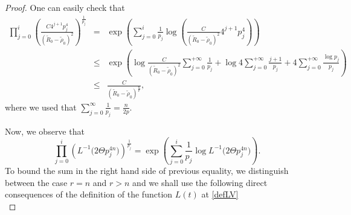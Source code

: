 \documentclass[12pt]{amsart}
\theoremstyle{definition}
\numberwithin{equation}{section}
\numberwithin{equation}{section}
\begin{document}
{\begin{proof}
One can easily check that
\begin{eqnarray*}
\displaystyle{\prod_{j=0}^{i}}\left({\frac{C4^{j+1} p_j^{4}}{( \tilde R_0- \tilde \rho_0 )^{2}}} \right)^{\frac{1}{p_j}}&=&\exp\left(\sum_{j=0}^i \frac{1}{p_j}\log\left(\frac{C}{( \tilde R_0- \tilde \rho_0 )^{2}}4^{j+1} p_j^{4}\right)\right)\\
&\le& \exp\left(\log{\frac{C }{( \tilde R_0-\tilde \rho_0
)^{2}}}\sum_{j=0}^{+\infty} \frac{1}{p_j}+\log4\sum_{j=0}^{+\infty}\frac{j+1}{p_j}+4\sum_{j=0}^{+\infty} \frac{\log p_j}{p_j}\right)\\
&\le & \frac{{C}}{( \tilde R_0- \tilde \rho_0
)^{\frac{n}{p}}},
\end{eqnarray*}
where we used that $\sum_{j=0}^{{\infty}}\frac{1}{p_j}= \frac{n}{2 p} $. 

Now, we observe that
$$\displaystyle{\prod_{j=0}^{i}}\left({{L}^{-1} \Big({2}\Theta p_j^{4n}\Big)} \right)^{\frac{1}{p_j}}=\exp\left(\sum_{j=0}^i \frac{1}{p_j}\log{{L}^{-1} \Big({2} \Theta p_j^{4n}\Big)}\right). $$
To bound the sum in the right hand side of previous equality, we distinguish between the case $r=n$ and $r>n$ and we shall use the following {direct consequences of the definition of the function $L(t)$ at \eqref{defLV}} 
\begin{equation}\label{F6}

\end{equation}
\end{proof}}
\end{document}
